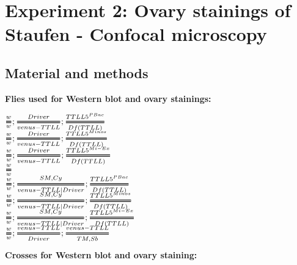 \documentclass{article}
\newcommand{\Tfrac}[2]{%
	\ooalign{%
		$\genfrac{}{}{2.5pt}1{#1}{#2}$\cr%
		$\color{white}\genfrac{}{}{.8pt}1{\phantom{#1}}{\phantom{#2}}$}%
}
\begin{document}
\newpage
\section*{Experiment 2: Ovary stainings of Staufen - Confocal microscopy}

\subsection*{Material and methods}

\textbf{Flies used for Western blot and ovary stainings:}\\

\begin{multicols}{2}
	\begin{Large}
		$\Tfrac{w}{w}; \Tfrac{Driver}{venus-TTLL}; \Tfrac{TTLL5^{PBac}}{Df(TTLL)} $\\
		
		$\Tfrac{w}{w}; \Tfrac{Driver}{venus-TTLL}; \Tfrac{TTLL5^{Minos}}{Df(TTLL)} $\\
		
		$\Tfrac{w}{w}; \Tfrac{Driver}{venus-TTLL}; \Tfrac{TTLL5^{Mi-Ex}}{Df(TTLL)} $\\
		
		$\Tfrac{w}{w}$\\
		
		$\Tfrac{w}{w}; \Tfrac{SM, Cy}{venus-TTLL | Driver}; \Tfrac{TTLL5^{PBac}}{Df(TTLL)} $\\
		
		$\Tfrac{w}{w}; \Tfrac{SM, Cy}{venus-TTLL | Driver}; \Tfrac{TTLL5^{Minos}}{Df(TTLL)} $\\
		
		$\Tfrac{w}{w}; \Tfrac{SM, Cy}{venus-TTLL | Driver}; \Tfrac{TTLL5^{Mi-Ex}}{Df(TTLL)} $\\
		
		$\Tfrac{w}{w}; \Tfrac{venus-TTLL}{Driver}; \Tfrac{venus-TTLL}{TM, Sb} $\\
		
		
	\end{Large}
\end{multicols}

\textbf{Crosses for Western blot and ovary staining:} \\
\end{document}
